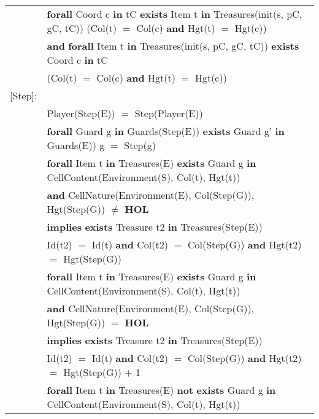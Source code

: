 \documentclass[8pt]{article}
\begin{document}
{\begin{longtable}{rl}
  & \textbf{forall} \textrm{Coord} c \textbf{in} tC \textbf{exists} \textrm{Item} t \textbf{in} \textrm{Treasures(init(s, pC, gC, tC))} (\textrm{Col(t)} $=$ \textrm{Col(c)} \textbf{and} \textrm{Hgt(t)} $=$ \textrm{Hgt(c)})\\
  & \quad\quad \textbf{and} \textbf{forall} \textrm{Item} t \textbf{in} \textrm{Treasures(init(s, pC, gC, tC))} \textbf{exists} \textrm{Coord} c \textbf{in} tC\\
  & \quad\quad\quad\quad (\textrm{Col(t)} $=$ \textrm{Col(c)} \textbf{and} \textrm{Hgt(t)} $=$ \textrm{Hgt(c)})\\
  \textrm{[Step]}:&\\
  & \textrm{Player(Step(E))} $=$ \textrm{Step(Player(E))}\\
  & \textbf{forall} \textrm{Guard} g \textbf{in} \textrm{Guards(Step(E))} \textbf{exists} \textrm{Guard} g' \textbf{in} \textrm{Guards(E))} g $=$ \textrm{Step(g)}\\
  & \textbf{forall} \textrm{Item} t \textbf{in} \textrm{Treasures(E)} \textbf{exists} \textrm{Guard} g \textbf{in} \textrm{CellContent(Environment(S), Col(t), Hgt(t))}\\
  & \quad\quad \textbf{and} \textrm{CellNature(Environment(E), Col(Step(G)), Hgt(Step(G))} $\ne$ \textbf{HOL}\\
  & \quad\quad \textbf{implies} \textbf{exists} \textrm{Treasure} t2 \textbf{in} \textrm{Treasures(Step(E))}\\
  & \quad\quad\quad\quad \textrm{Id(t2)} $=$ \textrm{Id(t)} \textbf{and} \textrm{Col(t2)} $=$ \textrm{Col(Step(G))} \textbf{and} \textrm{Hgt(t2)} $=$ \textrm{Hgt(Step(G))}\\
  & \textbf{forall} \textrm{Item} t \textbf{in} \textrm{Treasures(E)} \textbf{exists} \textrm{Guard} g \textbf{in} \textrm{CellContent(Environment(S), Col(t), Hgt(t))}\\
  & \quad\quad \textbf{and} \textrm{CellNature(Environment(E), Col(Step(G)), Hgt(Step(G))} $=$ \textbf{HOL}\\
  & \quad\quad \textbf{implies} \textbf{exists} \textrm{Treasure} t2 \textbf{in} \textrm{Treasures(Step(E))}\\
  & \quad\quad\quad\quad \textrm{Id(t2)} $=$ \textrm{Id(t)} \textbf{and} \textrm{Col(t2)} $=$ \textrm{Col(Step(G))} \textbf{and} \textrm{Hgt(t2)} $=$ \textrm{Hgt(Step(G))} $+$ 1\\
& \textbf{forall} \textrm{Item} t \textbf{in} \textrm{Treasures(E)} \textbf{not} \textbf{exists} \textrm{Guard} g \textbf{in} \textrm{CellContent(Environment(S), Col(t), Hgt(t))}\\

\end{longtable}}
\end{document}
